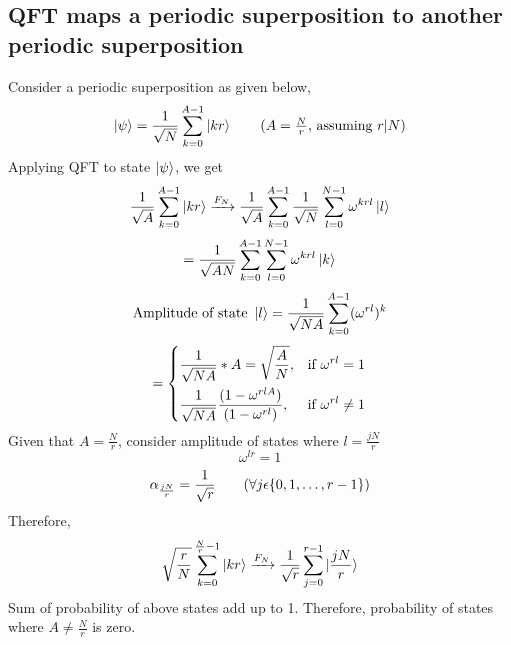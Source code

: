 \documentclass[11.5pt, paper=a4]{article}
\theoremstyle{definition}
\numberwithin{theorem}{section}
\begin{document}
\subsection{QFT maps a periodic superposition to another periodic superposition}
Consider a periodic superposition as given below,
\begin{equation*}
    \ket{\psi} = \frac{1}{\sqrt{N}}\sum_{k=0}^{A-1}\ket{kr}\tag{$A = \frac{N}{r}$\text{, assuming $r\vert N$}}
\end{equation*}
Applying QFT to state $\ket{\psi}$, we get
\begin{equation*}
    \frac{1}{\sqrt{A}}\sum_{k=0}^{A-1}\ket{kr} \xrightarrow{F_N} \frac{1}{\sqrt{A}}\sum_{k=0}^{A-1}\frac{1}{\sqrt{N}}\sum_{l=0}^{N-1}\omega^{krl}\ket{l}
\end{equation*}
\begin{equation*}
    = \frac{1}{\sqrt{AN}}\sum_{k=0}^{A-1}\sum_{l=0}^{N-1}\omega^{krl}\ket{k}
\end{equation*}
\begin{equation*}
    \text{Amplitude of state }\ket{l} = \frac{1}{\sqrt{NA}}\sum_{k=0}^{A-1}(\omega^{rl})^k
\end{equation*}
\begin{equation*}
    = \begin{dcases}
    \frac{1}{\sqrt{NA}}*A = \sqrt{\frac{A}{N}},& \text{if }\omega^{rl}=1\\
    \frac{1}{\sqrt{NA}}\frac{(1-\omega^{rlA})}{(1-\omega^{rl})},& \text{if }\omega^{rl}\neq1
    \end{dcases}
\end{equation*}
Given that $A=\frac{N}{r}$, consider amplitude of states where $l=\frac{jN}{r}$
\begin{equation*}
    \omega^{lr}=1
\end{equation*}
\begin{equation*}
    \alpha_{\frac{jN}{r}}=\frac{1}{\sqrt{r}}\tag{$\forall j\epsilon\{0,1,\dots,r-1\}$}
\end{equation*}
Therefore,
\begin{equation}
\label{eqn:QFT on a periodic state}
    \sqrt{\frac{r}{N}}\sum_{k=0}^{\frac{N}{r}-1}\ket{kr} \xrightarrow{F_N} \frac{1}{\sqrt{r}}\sum_{j=0}^{r-1}\ket{\frac{jN}{r}}
\end{equation}
Sum of probability of above states add up to 1. Therefore, probability of states where $A\neq\frac{N}{r}$ is zero.
\end{document}
